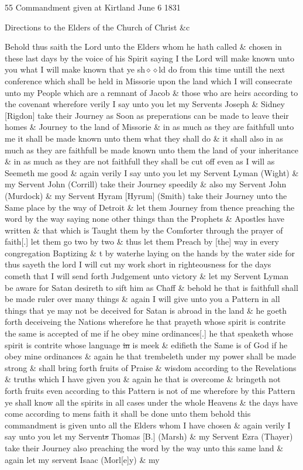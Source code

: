 				\begin{tightcenter}
				55 Commandment given at Kirtland June 6 1831
				\end{tightcenter}
				
				Directions to the Elders of the Church of Christ \&c
				
				Behold thus saith the Lord unto the Elders whom he hath called \& chosen in these last days by the voice of his Spirit saying I the Lord will make known unto you what I will make known that ye sh$\diamond\diamond$ld do from this time untill the next conference which shall be held in Missorie upon the land which I will consecrate unto my People which are a remnant of Jacob \& those who are heirs according to the covenant wherefore verily I say unto you let my Servents Joseph \& Sidney [Rigdon] take their Journey as Soon as preperations can be made to leave their homes \& Journey to the land of Missorie \& in as much as they are faithfull unto me it shall be made known unto them what they shall do \& it shall also in as much as they are faithfull be made known unto them the land of your inheritance \& in as much as they are not faithfull they shall be cut off even as I will as Seemeth me good \& again verily I say unto you let my Servent Lyman (Wight) \& my Servent John (Corrill) take their Journey speedily \& also my Servent John (Murdock) \& my Servent Hyram [Hyrum] (Smith) take their Journey unto the Same place by the way of Detroit \& let them Journey from thence preaching the word by the way saying none other things than the Prophets \& Apostles have written \& that which is Taught them by the Comforter through the prayer of faith[.] let them go two by two \& thus let them Preach by [the] way in every congregation Baptizing \& t by waterhe laying on the hands by the water side for thus sayeth the lord I will cut my work short in righteousness for the days cometh that I will send forth Judgement unto victory \& let my Servent Lyman be aware for Satan desireth to sift him as Chaff \& behold he that is faithfull shall be made ruler over many things \& again I will give unto you a Pattern in all things that ye may not be deceived for Satan is abroad in the land \& he goeth forth deceiveing the Nations wherefore he that prayeth whose spirit is contrite the same is accepted of me if he obey mine ordinances[.] he that speaketh whose spirit is contrite whose language \sout{in} is meek \& edifieth the Same is of God if he obey mine ordinances \& again he that trembeleth under my power shall be made strong \& shall bring forth fruits of Praise \& wisdom according to the Revelations \& truths which I have given you \& again he that is overcome \& bringeth not forth fruits even according to this Pattern is not of me wherefore by this Pattern ye shall know all the spirits in all cases under the whole Heavens \& the days have come according to mens faith it shall be done unto them behold this commandment is given unto all the Elders whom I have chosen \& again verily I say unto you let my Servent\sout{s} Thomas [B.] (Marsh) \& my Servent Ezra (Thayer) take their Journey also preaching the word by the way unto this same land \& again let my servent Isaac (Morl[e]y) \& my 